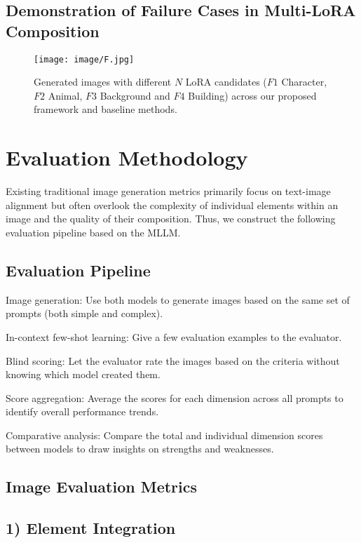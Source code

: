 \subsection{Demonstration of Failure Cases in Multi-LoRA Composition}
\begin{figure}[H]
\begin{center}
\texttt{[image: image/F.jpg]}
\end{center}
\caption{Generated images with different $N$ LoRA candidates ($F1$ Character, $F2$ Animal, $F3$ Background and $F4$ Building) across our proposed framework and baseline methods.}
\end{figure}

\section{Evaluation Methodology}
\label{sec:appendixc}
Existing traditional image generation metrics primarily focus on text-image alignment but often overlook the complexity of individual elements within an image and the quality of their composition. Thus, we construct the following evaluation pipeline based on the MLLM.

\subsection{Evaluation Pipeline}
Image generation: Use both models to generate images based on the same set of prompts (both simple and complex).

In-context few-shot learning: Give a few evaluation examples to the evaluator.

Blind scoring: Let the evaluator rate the images based on the criteria without knowing which model created them.

Score aggregation: Average the scores for each dimension across all prompts to identify overall performance trends.

Comparative analysis: Compare the total and individual dimension scores between models to draw insights on strengths and weaknesses.

\subsection{Image Evaluation Metrics}
\subsection*{1) Element Integration}

